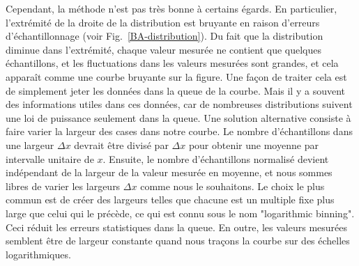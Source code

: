 Cependant, la méthode n'est pas très bonne à certains égards. En particulier, l'extrémité de la droite de la distribution est bruyante en raison d'erreurs d'échantillonnage (voir Fig.~\ref{BA-distribution}). Du fait que la distribution diminue dans l'extrémité,  chaque valeur mesurée ne contient que quelques échantillons, et les fluctuations dans les valeurs mesurées sont grandes, et cela apparaît comme une courbe bruyante sur la figure. Une façon de traiter cela est de simplement jeter les données dans la queue de la courbe. Mais il y a souvent des informations utiles dans ces données, car de nombreuses distributions suivent une loi de puissance seulement dans la queue. Une solution alternative consiste à faire varier la largeur des cases dans notre courbe. Le nombre d'échantillons dans une largeur $\Delta x$ devrait être divisé par $\Delta x$ pour obtenir une moyenne par intervalle unitaire de $x$. Ensuite, le nombre d'échantillons normalisé devient indépendant de la largeur de la valeur mesurée en moyenne, et nous sommes libres de varier les largeurs $\Delta x$ comme nous le souhaitons. Le choix le plus commun est de créer des largeurs telles que chacune est un multiple fixe plus large que celui qui le précède, ce qui est connu sous le nom "logarithmic binning". Ceci réduit les erreurs statistiques dans la queue. En outre, les valeurs mesurées semblent être de largeur constante quand nous traçons la courbe sur des échelles logarithmiques.
